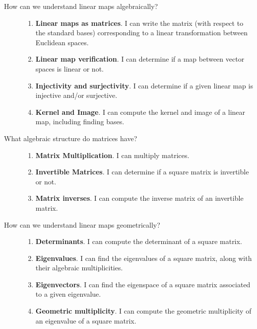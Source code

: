 \documentclass{article}
\begin{document}
\begin{description}
\item[How can we understand linear maps algebraically?] \hfill
\begin{enumerate}
\item {\bf Linear maps as matrices}.  I can write the matrix (with respect to the standard bases) corresponding to a linear transformation between Euclidean spaces.
\item {\bf Linear map verification}. I can determine if a map between vector spaces is linear or not.
\item {\bf Injectivity and surjectivity}.  I can determine if a given linear map is injective and/or surjective.
\item {\bf Kernel and Image}. I can compute the kernel and image of a linear map, including finding bases.
\end{enumerate}


\item[What algebraic structure do matrices have?] \hfill
\begin{enumerate}
\item {\bf Matrix Multiplication}. I can multiply matrices.
\item {\bf Invertible Matrices}. I can determine if a square matrix is invertible or not.
\item {\bf Matrix inverses}.  I can compute the inverse matrix of an invertible matrix.
\end{enumerate}


\item[How can we understand linear maps geometrically?] \hfill
\begin{enumerate}
\item {\bf Determinants}. I can compute the determinant of a square matrix.
\item {\bf Eigenvalues}. I can find the eigenvalues of a square matrix, along with their algebraic multiplicities.
\item {\bf Eigenvectors}. I can find the eigenspace of a square matrix associated to a given eigenvalue.
\item {\bf Geometric multiplicity}. I can compute the geometric multiplicity of an eigenvalue of a square matrix.
\end{enumerate}

\end{description}
\end{document}
